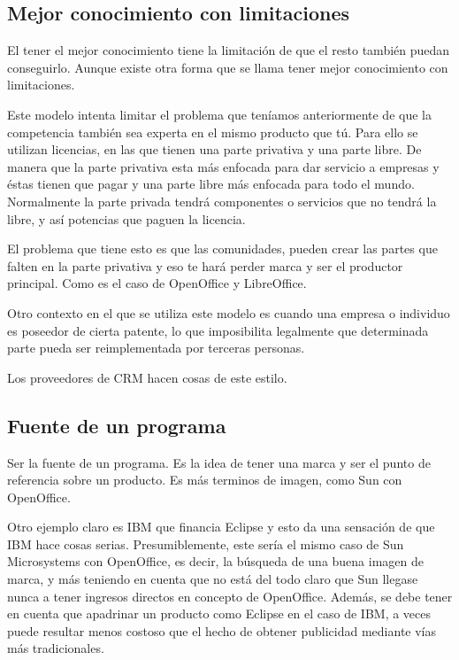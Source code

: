\subsection{Mejor conocimiento con limitaciones}

El tener el mejor conocimiento tiene la limitación de que el resto también
puedan conseguirlo. Aunque existe otra forma que se llama tener
mejor conocimiento con limitaciones.

Este modelo intenta limitar el problema que teníamos anteriormente de que la
competencia también sea experta en el mismo producto que tú. Para ello se
utilizan licencias, en las que tienen una parte privativa y una parte libre. De
manera que la parte privativa esta más enfocada para dar servicio a empresas y
éstas tienen que pagar y una parte libre más enfocada para todo el mundo.
Normalmente la parte privada tendrá componentes o servicios que no tendrá la
libre, y así potencias que paguen la licencia.

El problema que tiene esto es que las comunidades, pueden crear las partes
que falten en la parte privativa y eso te hará perder marca y ser el productor
principal. Como es el caso de OpenOffice y LibreOffice.

Otro contexto en el que se utiliza este modelo es cuando una empresa o
individuo es poseedor de cierta patente, lo que imposibilita
legalmente que determinada parte pueda ser reimplementada por terceras
personas.

Los proveedores de CRM hacen cosas de este estilo.


\subsection{Fuente de un programa}

Ser la fuente de un programa. Es la idea de tener una marca y ser el punto de
referencia sobre un producto. Es más terminos de imagen, como Sun con OpenOffice.

Otro ejemplo claro es IBM que financia Eclipse y esto da una sensación de que
IBM hace cosas serias. Presumiblemente, este sería el mismo caso de Sun
Microsystems con OpenOffice, es decir, la búsqueda de una buena imagen de
marca, y más teniendo en cuenta que no está del todo claro que Sun llegase
nunca a tener ingresos directos en concepto de OpenOffice. Además, se debe
tener en cuenta que apadrinar un producto como Eclipse en el caso de IBM, a
veces puede resultar menos costoso que el hecho de obtener publicidad mediante
vías más tradicionales.

